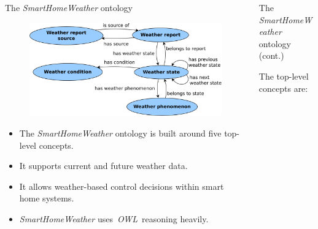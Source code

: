 \documentclass[final,hyperref={pdfpagelabels=true}]{beamer}
\begin{document}
\begin{frame}[fragile]
\begin{columns}[t]
\begin{column}{.45\textwidth}
      \begin{block}{The \emph{SmartHomeWeather} ontology}
        \begin{figure}
	  \vspace{-.5em}
	  \centering
  	  \includegraphics[width=.45\textwidth]{figures/dia/binary-relations}
	\end{figure}

	\vspace{-1.5em}

	\begin{itemize}
	  \item The \emph{SmartHomeWeather} ontology is built around five top-level concepts.
	  \item It supports current and future weather data.
	  \item It allows weather-based control decisions within smart home systems.
	  \item \emph{SmartHomeWeather} \mbox{uses \emph{OWL} reasoning} heavily.
	\end{itemize}

	\vspace{1.5em}
      \end{block}
    \end{column}

    \begin{column}{.45\textwidth}
      \begin{block}{The \emph{SmartHomeWeather} ontology (cont.)}
	\vspace{-.25em}

	The top-level concepts are:


\end{block}
\end{column}
\end{columns}
\end{frame}
\end{document}
